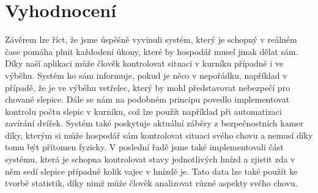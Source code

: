 ﻿\newpage
\chapter{Vyhodnocení}\label{ch:vyhodnoceni}

Závěrem lze říct, že jsme úspěšně vyvinuli systém, který je schopný v reálném čase pomáha plnit každodení úkony, které by hospodář musel jinak dělat sám. Díky naší aplikaci může člověk kontrolovat situaci v kurníku případně i ve výběhu. Systém ho sám informuje, pokud je něco v nepořádku, například v případě, že je ve výběhu vetřelec, který by mohl představovat nebezpečí pro chované slepice. Dále se nám na podobném principu povedlo implementovat kontrolu počtu slepic v kurníku, což lze použít například při automatizaci zavírání dvířek. Systém také poskytuje aktuální záběry z bezpečnostních kamer díky, kterým si může hospodář sám kontrolovat situaci svého chovu a nemusí díky tomu být přítomen fyzicky. V poslední řadě jsme také implementovali část systému, která je schopna kontrolovat stavy jednotlivých hnízd a zjistit zda v něm sedí slepice případně kolik vajec v hnízdě je. Tato data lze také použít ke tvorbě statistik, díky nimž může člověk analizovat různé aspekty svého chovu.


\printbibliography[title=Použitá Literatura]

\listoffigures

\listoftables

\listoflistedequation